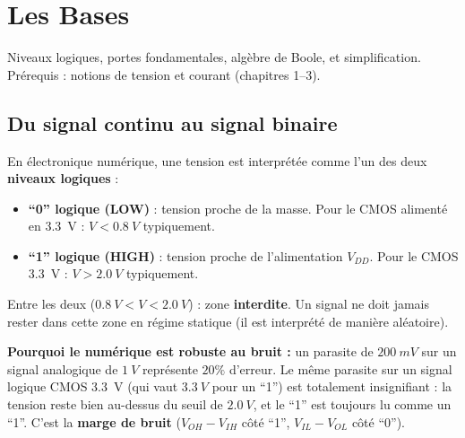 \documentclass[12pt,a4paper,twoside]{book}
\begin{document}
\section{Les Bases}

\begin{bases}
Niveaux logiques, portes fondamentales, algèbre de Boole, et simplification. Prérequis : notions de tension et courant (chapitres 1--3).
\end{bases}

\subsection{Du signal continu au signal binaire}

\begin{formule}
En électronique numérique, une tension est interprétée comme l'un des deux \textbf{niveaux logiques} :

\begin{itemize}[nosep]
\item \textbf{``0'' logique (LOW)} : tension proche de la masse. Pour le CMOS alimenté en \SI{3.3}{V} : $V < \SI{0.8}{V}$ typiquement.
\item \textbf{``1'' logique (HIGH)} : tension proche de l'alimentation $V_{DD}$. Pour le CMOS \SI{3.3}{V} : $V > \SI{2.0}{V}$ typiquement.
\end{itemize}

Entre les deux ($\SI{0.8}{V} < V < \SI{2.0}{V}$) : zone \textbf{interdite}. Un signal ne doit jamais rester dans cette zone en régime statique (il est interprété de manière aléatoire).
\end{formule}

\begin{intuition}
\textbf{Pourquoi le numérique est robuste au bruit :} un parasite de $\SI{200}{mV}$ sur un signal analogique de $\SI{1}{V}$ représente $20\%$ d'erreur. Le même parasite sur un signal logique CMOS \SI{3.3}{V} (qui vaut $\SI{3.3}{V}$ pour un ``1'') est totalement insignifiant : la tension reste bien au-dessus du seuil de $\SI{2.0}{V}$, et le ``1'' est toujours lu comme un ``1''. C'est la \textbf{marge de bruit} ($V_{OH} - V_{IH}$ côté ``1'', $V_{IL} - V_{OL}$ côté ``0'').
\end{intuition}
\end{document}
